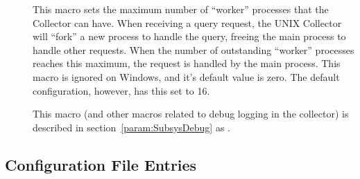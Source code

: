 \begin{description}
 \item[]
  \label{param:CollectorQueryWorkers} This macro sets the maximum
  number of ``worker'' processes that the Collector can have.  When
  receiving a query request, the UNIX Collector will ``fork'' a new
  process to handle the query, freeing the main process to handle
  other requests.  When the number of outstanding ``worker'' processes
  reaches this maximum, the request is handled by the main process.
  This macro is ignored on Windows, and it's default value is zero.
  The default configuration, however, has this set to 16.

\item[] \label{param:CollectorDebug} This
  macro (and other macros related to debug logging in the collector)
  is described in section~\ref{param:SubsysDebug} as
  .

\end{description}

\subsection{\label{sec:Negotiator-Config-File-Entries}
Configuration File Entries}

